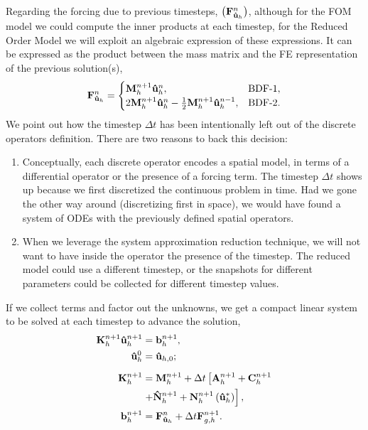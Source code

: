 \documentclass[../../thesis.tex]{subfiles}
\newcommand{\dt}{\ensuremath{\Delta t}}
\newcommand{\Ah}[1]{\ensuremath{\vb{#1}^{n+1}_h}}
\begin{document}
Regarding the forcing due to previous timesteps, $\left(\vb{F}_{\vb{\hat{u}}_h}^{n}\right)$, 
although for the FOM model we could compute the inner products at each timestep, 
for the Reduced Order Model we will exploit an algebraic expression of these expressions.
It can be expressed as the product between the mass matrix and the FE representation of the previous solution(s), 
\begin{equation}
    \label{eq:1d_fom_forcing_term_time_mass_matrix}
    \vb{F}_{\vb{\hat{u}}_h}^{n}= 
    \begin{cases}
        \vb{M}_{h}^{n+1} \vb{\hat{u}}_{h}^{n},                &\text{BDF-1},
        \\
        2\vb{M}_{h}^{n+1} \vb{\hat{u}}_{h}^{n}
        - \frac{1}{2}\vb{M}_{h}^{n+1} \vb{\hat{u}}_{h}^{n-1}, &\text{BDF-2}.
    \end{cases}
\end{equation}
We point out how the timestep $\dt$ has been intentionally left out of the discrete operators definition.
There are two reasons to back this decision:
\begin{enumerate}
    \item Conceptually, each discrete operator encodes a spatial model, 
    in terms of a differential operator or the presence of a forcing term.
    The timestep $\dt$ shows up because we first discretized the continuous problem in time. 
    Had we gone the other way around (discretizing first in space), 
    we would have found a system of ODEs with the previously defined spatial operators. 
    \item When we leverage the system approximation reduction technique, 
    we will not want to have inside the operator the presence of the timestep.
    The reduced model could use a different timestep, 
    or the snapshots for different parameters could be collected for different timestep values.
\end{enumerate}

If we collect terms and factor out the unknowns, we get a compact linear system to be solved at each timestep to advance the solution,
\begin{subequations}
    \begin{align}
        \label{eq:1d_fom_linear_system_timestep}
        \vb{K}_h^{n+1} \vb{\hat{u}}_h^{n+1} &= \vb{b}_h^{n+1}, 
        \\
        \vb{\hat{u}}_h^{0} &= \vb{\hat{u}}_{h,0};
        \\[2mm]
        \vb{K}_h^{n+1} &= \Ah{M} + \dt \left[\Ah{A} + \Ah{C} \right. 
        \nonumber 
        \\
                        &\left. + \Ah{\hat{N}} + \Ah{N}\left(\vb{\hat{u}}_{h}^{*}\right)\right],
        \\
        \vb{b}_h^{n+1} &= \vb{F}_{\vb{\hat{u}}_h}^{n} + \dt \vb{F}_{g,h}^{n+1}.
    \end{align}
\end{subequations}
\end{document}
